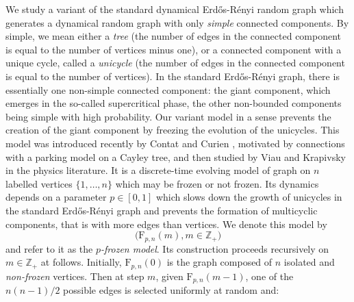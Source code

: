 \documentclass[a4, 11pt]{article}
\numberwithin{equation}{section}
\theoremstyle{plain}
\theoremstyle{definition}
\theoremstyle{remark}
\begin{document}
We study a variant of the standard dynamical Erd\H{o}s-R\'enyi random graph which generates a dynamical random graph with only \emph{simple} connected components. By simple, we mean either a \emph{tree} (the number of edges in the connected component is equal to the number of vertices minus one), or a connected component with a unique cycle, called a \emph{unicycle} (the number of edges in the connected component is equal to the number of vertices). 
In the standard Erd\H{o}s-R\'enyi graph, there is essentially one non-simple connected component: the giant component, which emerges in the so-called supercritical phase, the other non-bounded components being simple with high probability. Our variant model in a sense prevents the creation of the giant component by freezing the evolution of the unicycles. This model was introduced recently by Contat and Curien \cite{ContatCurien23}, motivated by connections with a parking model on a Cayley tree, and then studied by Viau \cite{viau24,viau25} and Krapivsky \cite{krapisvky24} in the physics literature. It is a discrete-time evolving model of graph on $n$ labelled vertices $\{1,\ldots,n\}$ which may be frozen or not frozen.  Its dynamics depends on a parameter $p\in [0,1]$ which slows down the growth of unicycles in the standard Erd\H{o}s-R\'enyi graph and prevents the formation of multicyclic components, that is with more edges than vertices. We denote this model by $$\big(\mathrm{F}_{p,n}(m), m\in \mathbb Z_+\big)$$ and refer to it as the \emph{$p$-frozen model}. Its construction proceeds recursively on $m \in \mathbb Z_{+}$ at follows. Initially, $\mathrm{F}_{p,n}(0)$ is the graph composed of $n$ isolated and \emph{non-frozen} vertices. Then at step $m$, given $\mathrm{F}_{p,n}(m-1)$, one of the $n(n-1)/2$ possible edges is selected uniformly at random and:
\end{document}
